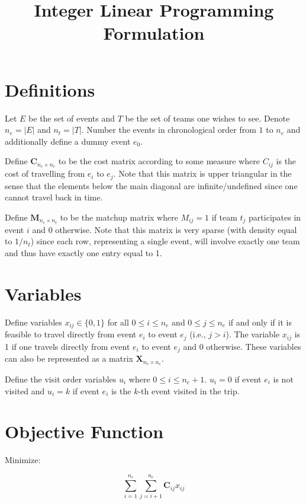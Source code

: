 \documentclass[11pt]{article}
\title{Integer Linear Programming Formulation}
\date{}
\begin{document}
\maketitle

\section{Definitions}
Let $E$ be the set of events and $T$ be the set of teams one wishes to see. Denote $n_e = |E|$ and $n_t = |T|$. Number the events in chronological order from $1$ to $n_e$ and additionally define a dummy event $e_0$.

Define $\mathbf{C}_{n_e \times n_e}$ to be the cost matrix according to some measure where $C_{ij}$ is the cost of travelling from $e_i$ to $e_j$. Note that this matrix is upper triangular in the sense that the elements below the main diagonal are infinite/undefined since one cannot travel back in time.

Define $\mathbf{M}_{n_e \times n_t}$ to be the matchup matrix where $M_{ij} = 1$ if team $t_j$ participates in event $i$ and 0 otherwise. Note that this matrix is very sparse (with density equal to $1/n_t$) since each row, representing a single event, will involve exactly one team and thus have exactly one entry equal to 1.

\section{Variables}
Define variables $x_{ij} \in \{0, 1\}$ for all $0 \leq i \leq n_e$ and $0 \leq j \leq n_e$ if and only if it is feasible to travel directly from event $e_i$ to event $e_j$ (i.e., $j > i$). The variable $x_{ij}$ is 1 if one travels directly from event $e_i$ to event $e_j$ and 0 otherwise. These variables can also be represented as a matrix $\mathbf{X}_{n_e \times n_e}$.

Define the visit order variables $u_i$ where $0 \leq i \leq n_e + 1$. $u_i = 0$ if event $e_i$ is not visited and $u_i = k$ if event $e_i$ is the $k$-th event visited in the trip.

\section{Objective Function}
Minimize:

\begin{equation} \label{eq:objective}
\sum_{i=1}^{n_e} \sum_{j=i+1}^{n_e} \mathbf{C}_{ij} x_{ij}
\end{equation}
\end{document}
